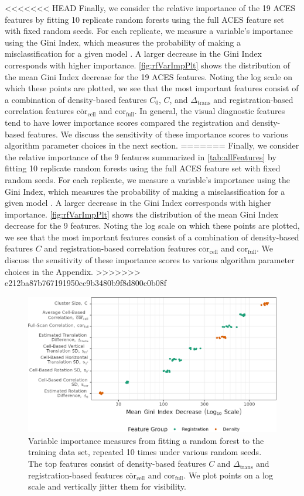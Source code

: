 \documentclass[reprint]{JASA}
\begin{document}
<<<<<<< HEAD
Finally, we consider the relative importance of the 19 ACES features by
fitting 10 replicate random forests using the full ACES feature set with
fixed random seeds. For each replicate, we measure a variable's
importance using the Gini Index, which measures the probability of
making a misclassification for a given model
\citep{hastie_elements_2008}. A larger decrease in the Gini Index
corresponds with higher importance. \autoref{fig:rfVarImpPlt} shows the
distribution of the mean Gini Index decrease for the 19 ACES features.
Noting the log scale on which these points are plotted, we see that the
most important features consist of a combination of density-based
features \(C_0\), \(C\), and \(\Delta_{\text{trans}}\) and
registration-based correlation features
\(\overline{\text{cor}}_{\text{cell}}\) and
\(\text{cor}_{\text{full}}\). In general, the visual diagnostic features
tend to have lower importance scores compared the registration and
density-based features. We discuss the sensitivity of these importance
scores to various algorithm parameter choices in the next section.
=======
Finally, we consider the relative importance of the 9 features
summarized in \autoref{tab:allFeatures} by fitting 10 replicate random
forests using the full ACES feature set with fixed random seeds. For
each replicate, we measure a variable's importance using the Gini Index,
which measures the probability of making a misclassification for a given
model \citep{hastie_elements_2008}. A larger decrease in the Gini Index
corresponds with higher importance. \autoref{fig:rfVarImpPlt} shows the
distribution of the mean Gini Index decrease for the 9 features. Noting
the log scale on which these points are plotted, we see that the most
important features consist of a combination of density-based features
\(C\) and registration-based correlation features
\(\overline{\text{cor}}_{\text{cell}}\) and
\(\text{cor}_{\text{full}}\). We discuss the sensitivity of these
importance scores to various algorithm parameter choices in the
Appendix.
>>>>>>> e212ba87b767191950cc9b3480b9f8d800c0b08f

\begin{figure}[htbp]
\includegraphics[width=.5\textwidth]{images/resultsPlots/varImpPlt} \caption{\label{fig:rfVarImpPlt} Variable importance measures from fitting a random forest to the training data set, repeated 10 times under various random seeds. The top features consist of  density-based features $C$ and $\Delta_{\text{trans}}$ and registration-based features $\overline{\text{cor}}_{\text{cell}}$ and $\text{cor}_{\text{full}}$. We plot points on a log scale and vertically jitter them for visibility.}\label{fig:unnamed-chunk-12}
\end{figure}
\end{document}
